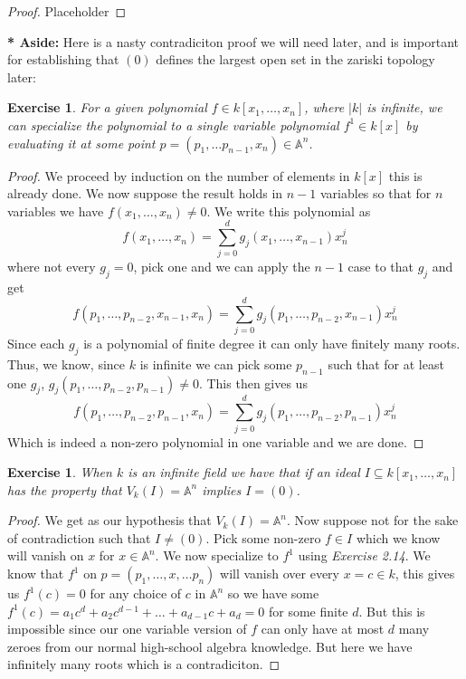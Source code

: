 \documentclass[11pt,a4paper]{article}
\newenvironment{asidebar}{%
    \def\FrameCommand{\vrule width 1.5pt \hspace{8pt}}%
    \MakeFramed{\advance\hsize-\width\FrameRestore}%
}{\endMakeFramed}
\newcommand{\aside}[1]{\begin{asidebar}\noindent\textbf{* Aside:} #1\end{asidebar}}
\theoremstyle{plain}
\newtheorem{exercise}[theorem]{Exercise}
\theoremstyle{definition}
\theoremstyle{remark}
\begin{document}
\begin{proof}
    Placeholder
\end{proof}
\aside{ Here is a nasty contradiciton proof we will need later, and is important for establishing that $(0)$ defines the largest open set in the zariski topology later:
\begin{exercise}
    For a given polynomial $f \in k[x_1, \dots, x_n]$, where $|k|$ is infinite, we can specialize the polynomial to a single variable polynomial $f^1 \in k[x]$ by evaluating it at some point $p = (p_1, \dots p_{n-1}, x_n) \in \mathbb{A}^n$. 
\end{exercise}

\begin{proof}
    We proceed by induction on the number of elements in $k[x]$ this is already done. We now suppose the result holds in $n-1$ variables so that for $n$ variables we have $f(x_1, \dots, x_n) \neq 0$. We write this polynomial as $$f(x_1, \dots, x_n) = \sum_{j=0}^d g_j(x_1, \dots, x_{n-1})x_n^j$$ where not every $g_j = 0$, pick one and we can apply the $n-1$ case to that $g_j$ and get $$f(p_1, \dots, p_{n-2}, x_{n-1}, x_n) = \sum_{j=0}^d g_j(p_1, \dots, p_{n-2}, x_{n-1})x_n^j$$ Since each $g_j$ is a polynomial of finite degree it can only have finitely many roots. Thus, we know, since $k$ is infinite we can pick some $p_{n-1}$ such that for at least one $g_j$, $g_j(p_1, \dots, p_{n-2}, p_{n-1}) \neq 0$. This then gives us $$f(p_1, \dots, p_{n-2}, p_{n-1}, x_n) = \sum_{j=0}^d g_j(p_1, \dots, p_{n-2}, p_{n-1})x_n^j$$ Which is indeed a non-zero polynomial in one variable and we are done. 
\end{proof}

\begin{exercise}
    When $k$ is an infinite field we have that if an ideal $I \subseteq k[x_1, \dots, x_n]$ has the property that $V_k(I) = \mathbb{A}^n$ implies $I = (0)$. 
\end{exercise}

\begin{proof}
    We get as our hypothesis that $V_k(I) = \mathbb{A}^n$. Now suppose not for the sake of contradiction such that $I \neq (0)$. Pick some non-zero $f \in I$ which we know will vanish on $x$ for $x \in \mathbb{A}^n$. We now specialize to $f^1$ using \emph{Exercise 2.14}. We know that $f^1$ on $p = (p_1, \dots, x, \dots p_n)$ will vanish over every $x=c \in k$, this gives us $f^1(c) = 0$ for any choice of $c$ in $\mathbb{A}^n$ so we have some $f^1(c) = a_1c^d+a_2c^{d-1} + \dots + a_{d-1}c + a_d = 0$ for some finite $d$. But this is impossible since our one variable version of $f$ can only have at most $d$ many zeroes from our normal high-school algebra knowledge. But here we have infinitely many roots which is a contradiciton. 
\end{proof}}
\end{document}
